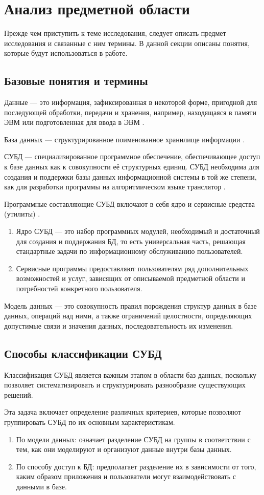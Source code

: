 \section{Анализ предметной области}
Прежде чем приступить к теме исследования, следует описать предмет исследования и связанные с ним термины.
В данной секции описаны понятия, которые будут использоваться в работе.

\subsection{Базовые понятия и термины}

Данные --- это информация, зафиксированная в некоторой форме, пригодной для последующей обработки, передачи и хранения, например, находящаяся в памяти ЭВМ или подготовленная для ввода в ЭВМ \cite{basedef}.

База данных --- структурированное поименованное хранилище информации \cite{basedef}.

СУБД --- специализированное программное обеспечение, обеспечивающее доступ к базе данных как к совокупности её структурных единиц.
СУБД необходима для создания и поддержки базы данных информационной системы в той же степени, как для разработки программы на алгоритмическом языке транслятор \cite{basedef}.

Программные составляющие СУБД включают в себя ядро и сервисные средства (утилиты) \cite{basedef}.
\begin{enumerate}
	\item Ядро СУБД --- это набор программных модулей, необходимый и достаточный для создания и поддержания БД, то есть универсальная часть, решающая стандартные задачи по информационному обслуживанию пользователей.
	\item Сервисные программы предоставляют пользователям ряд дополнительных возможностей и услуг, зависящих от описываемой предметной области и потребностей конкретного пользователя.
\end{enumerate}
\clearpage
Модель данных --- это совокупность правил порождения структур данных в базе данных, операций над ними, а также ограничений целостности, определяющих допустимые связи и значения данных, последовательность их изменения.

\subsection{Способы классификации СУБД}
Классификация СУБД является важным этапом в области баз данных, поскольку позволяет систематизировать и структурировать разнообразие существующих решений.

Эта задача включает определение различных критериев, которые позволяют группировать СУБД по их основным характеристикам.
\begin{enumerate}
	\item По модели данных: означает разделение СУБД на группы в соответствии с тем, как они моделируют и организуют данные внутри базы данных.
	\item По способу доступ к БД: предполагает разделение их в зависимости от того, каким образом приложения и пользователи могут взаимодействовать с данными в базе.
\end{enumerate}